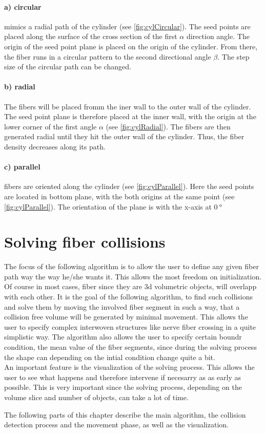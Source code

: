 \paragraph{a) circular} mimics a radial path of the cylinder (see \cref{fig:cylCircular}).
The seed points are placed along the surface of the cross section of the first $\alpha$ direction angle.
The origin of the seed point plane is placed on the origin of the cylinder.
From there, the fiber runs in a circular pattern to the second directional angle $\beta$.
The step size of the circular path can be changed.
% 
\paragraph{b) radial} The fibers will be placed fromm the iner wall to the outer wall of the cylinder.
The seed point plane is therefore placed at the inner wall, with the origin at the lower corner of the first angle $\alpha$ (see \cref{fig:cylRadial}).
The fibers are then generated radial until they hit the outer wall of the cylinder.
Thus, the fiber density decreases along its path.
% 
\paragraph{c) parallel} fibers are oriented along the cylinder (see \cref{fig:cylParallel}).
Here the seed points are located in bottom plane, with the both origins at the same point (see \cref{fig:cylParallel}). The orientation of the plane is with the x-axis at $\SI{0}{\degree}$
% 
% 
% 
\section{Solving fiber collisions}
\label{sec:Solver}
% 
% 
The focus of the following algorithm is to allow the user to define any given fiber path way the way he/she wants it.
This allows the most freedom on initialization.
Of course in most cases, fiber since they are 3d volumetric objects, will overlapp with each other.
It is the goal of the following algorithm, to find such collisions and solve them by moving the involved fiber segment in such a way, that a collision free volume will be generated by minimal movement.
% 
This allows the user to specify complex interwoven structures like nerve fiber crossing in a quite simplistic way.
% 
The algorithm also allows the user to specify certain boundr condition, \eg{} the mean value of the fiber segments, since during the solving process the shape can depending on the intial condition change quite a bit.
\\
An important feature is the visualization of the solving process.
This allows the user to see what happens and therefore intervene if necesarry as as early as possible.
This is very important since the solving process, depending on the volume slice and number of objects, can take a lot of time.
\par
% 
The following parts of this chapter describe the main algorithm, \ie{} the collision detection process and the movement phase, as well as the visualization.
% 
%
